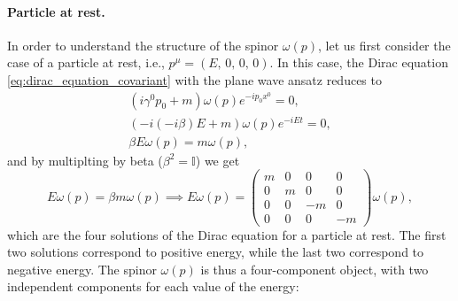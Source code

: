 \paragraph{Particle at rest.}
In order to understand the structure of the spinor \(\omega(p)\), let us first consider the case of a particle at rest, i.e., \(p^{\mu} = (E,\, 0,\, 0,\, 0)\). In this case, the Dirac equation \eqref{eq:dirac_equation_covariant} with the plane wave ansatz reduces to
\[
    \begin{aligned}
        \left(i\gamma^0 p_0 + m \right) \omega(p) e^{-i p_0 x^0} = 0, \\
        \left(-i (-i \beta) E + m\right) \omega(p) e^{-i Et} = 0,     \\
        \beta E \omega(p) = m \omega(p),
    \end{aligned}
\]
and by multiplting by beta (\(\beta^2 = \mathbb{I}\)) we get
\[
    E \omega(p) = \beta m \omega(p) \implies E \omega(p) = \begin{pmatrix}
        m & 0 & 0  & 0  \\
        0 & m & 0  & 0  \\
        0 & 0 & -m & 0  \\
        0 & 0 & 0  & -m
    \end{pmatrix} \omega(p),
\]
which are the four solutions of the Dirac equation for a particle at rest. The first two solutions correspond to positive energy, while the last two correspond to negative energy. The spinor \(\omega(p)\) is thus a four-component object, with two independent components for each value of the energy:
